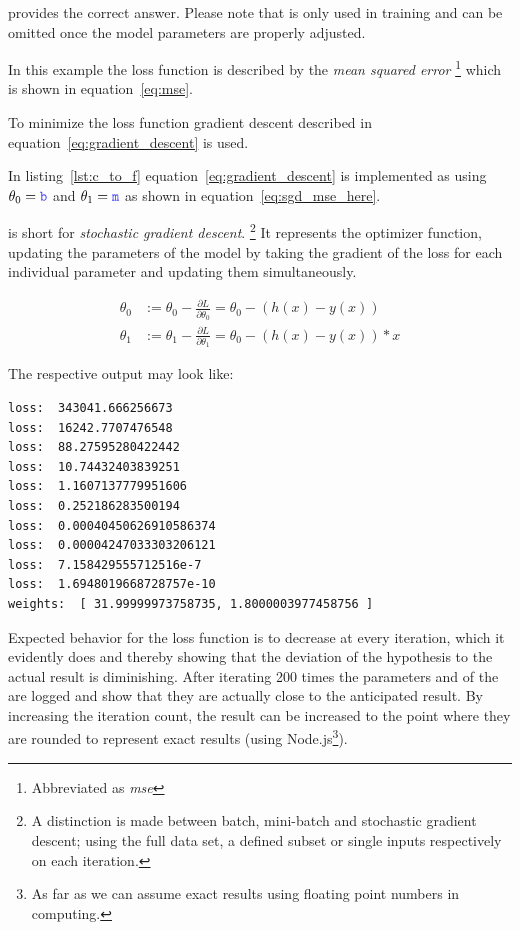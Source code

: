  provides the correct answer.
Please note that  is only used in training and can be omitted once the model parameters are properly adjusted.

In this example the loss function is described by the \textit{mean squared error } \footnote{ Abbreviated as \textit{mse} } which is shown in equation~\eqref{eq:mse}.

To minimize the loss function gradient descent described in equation~\eqref{eq:gradient_descent} is used.

In listing~\ref{lst:c_to_f} equation~\eqref{eq:gradient_descent} is implemented as  using $\theta_0 = \code{b}$ and $\theta_1= \code{m}$ as shown in equation~\eqref{eq:sgd_mse_here}.

 is short for \textit{stochastic gradient descent}.
\footnote{A distinction is made between batch, mini-batch and stochastic
    gradient descent;
    using the full data set, a defined subset or single inputs respectively on
    each iteration.}
It represents the optimizer function, updating the parameters of the model by taking the gradient of the loss for each individual parameter and updating them simultaneously.

\begin{equation}
    \begin{split}
        \theta_{0} & := \theta_{0} - \frac{\partial L}{\partial \theta_{0}} =
        \theta_{0} - (h(x) - y(x))  \\
        \theta_{1} & := \theta_{1} - \frac{\partial L}{\partial \theta_{1}} =
        \theta_{0} - (h(x) - y(x)) * x
    \end{split}
    \label{eq:sgd_mse_here}
\end{equation}

The respective output may look like:
\begin{lstlisting}
loss:  343041.666256673
loss:  16242.7707476548
loss:  88.27595280422442
loss:  10.74432403839251
loss:  1.1607137779951606
loss:  0.252186283500194
loss:  0.00040450626910586374
loss:  0.00004247033303206121
loss:  7.158429555712516e-7
loss:  1.6948019668728757e-10
weights:  [ 31.99999973758735, 1.8000003977458756 ]
\end{lstlisting} 

Expected behavior for the loss function is to decrease at every iteration, which it evidently does and thereby showing that the deviation of the hypothesis to the actual result is diminishing.
After iterating 200 times the parameters  and  of the  are logged and show that they are actually close to the anticipated result.
By increasing the iteration count, the result can be increased to the point where they are rounded to represent exact results (using Node.js\footnote{ As far as we can assume exact results using floating point numbers in computing.}).

